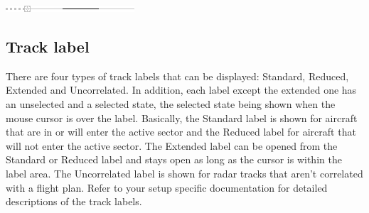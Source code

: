 \documentclass[11pt,a4paper,oldfontcommands]{memoir}
\begin{document}
\includegraphics{img/rps_predline+history_selected.png}

\subsection{Track label}
There are four types of track labels that can be displayed: Standard, Reduced, Extended and Uncorrelated.
In addition, each label except the extended one has an unselected and a selected state, the selected state
being shown when the mouse cursor is over the label.
\medskip
Basically, the Standard label is shown for aircraft that are in or will enter the active sector and the Reduced
label for aircraft that will not enter the active sector. The Extended label can be opened from the Standard
or Reduced label and stays open as long as the cursor is within the label area. The Uncorrelated label is
shown for radar tracks that aren’t correlated with a flight plan.
\medskip
Refer to your setup specific documentation for detailed descriptions of the track labels.\\
\end{document}
